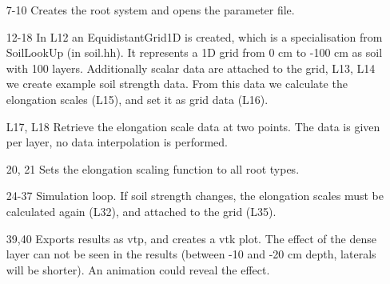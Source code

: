 \begin{itemize}

\item[7-10] Creates the root system and opens the parameter file.

\item[12-18] In L12 an EquidistantGrid1D is created, which is a specialisation from SoilLookUp (in soil.hh). It represents a 1D grid from 0 cm to -100 cm as soil with 100 layers. Additionally scalar data are attached to the grid, L13, L14 we create example soil strength data. From this data we calculate the elongation scales (L15), and set it as grid data (L16). 

\item[L17, L18] Retrieve the elongation scale data at two points. The data is given per layer, no data interpolation is performed.

\item[20, 21] Sets the elongation scaling function to all root types.

\item[24-37] Simulation loop. If soil strength changes, the elongation scales must be calculated again (L32), and attached to the grid (L35).

\item[39,40] Exports results as vtp, and creates a vtk plot. The effect of the dense layer can not be seen in the results (between -10 and -20 cm depth, laterals will be shorter). An animation could reveal the effect. 

\end{itemize}

